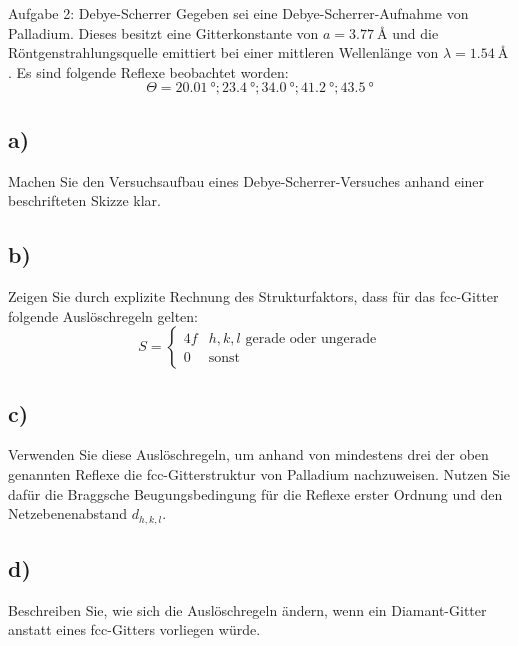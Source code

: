 \begin{aufgabe}{Aufgabe 2: Debye-Scherrer}
    Gegeben sei eine Debye-Scherrer-Aufnahme von Palladium.
    Dieses besitzt eine Gitterkonstante von $a = \SI{3.77}{\angstrom}$
    und die Röntgenstrahlungsquelle emittiert bei einer mittleren Wellenlänge von $\lambda = \SI{1.54}{\angstrom}$.
    Es sind folgende Reflexe beobachtet worden:
    \[
        \Theta =
            \SI{20.01}{\degree};
            \SI{23.4}{\degree};
            \SI{34.0}{\degree};
            \SI{41.2}{\degree};
            \SI{43.5}{\degree}
    \]

    \subsection{a)}
    Machen Sie den Versuchsaufbau eines Debye-Scherrer-Versuches anhand einer beschrifteten Skizze klar.

    \subsection{b)}
    Zeigen Sie durch explizite Rechnung des Strukturfaktors,
    dass für das fcc-Gitter folgende Auslöschregeln gelten:
    \[
        S = \begin{cases}
            4f & \text{$h,k,l$ gerade oder ungerade} \\
            0 & \text{sonst}
        \end{cases}
    \]

    \subsection{c)}
    Verwenden Sie diese Auslöschregeln,
    um anhand von mindestens drei der oben genannten Reflexe die fcc-Gitterstruktur von Palladium nachzuweisen.
    Nutzen Sie dafür die Braggsche Beugungsbedingung für die Reflexe erster Ordnung und den Netzebenenabstand $d_{h,k,l}$.

    \subsection{d)}
    Beschreiben Sie, wie sich die Auslöschregeln ändern,
    wenn ein Diamant-Gitter anstatt eines fcc-Gitters vorliegen würde.
\end{aufgabe}

